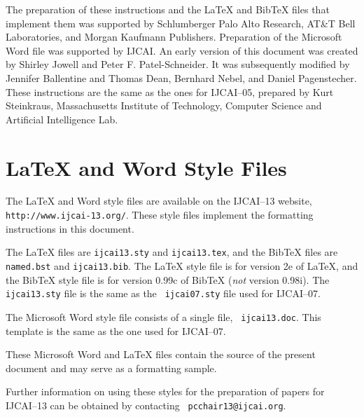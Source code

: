 \documentclass{article}
\begin{document}
The preparation of these instructions and the \LaTeX{} and Bib\TeX{}
files that implement them was supported by Schlumberger Palo Alto
Research, AT\&T Bell Laboratories, and Morgan Kaufmann Publishers.
Preparation of the Microsoft Word file was supported by IJCAI.  An
early version of this document was created by Shirley Jowell and Peter
F. Patel-Schneider.  It was subsequently modified by Jennifer
Ballentine and Thomas Dean, Bernhard Nebel, and Daniel Pagenstecher.
These instructions are the same as the ones for IJCAI--05, prepared by
Kurt Steinkraus, Massachusetts Institute of Technology, Computer
Science and Artificial Intelligence Lab.

\appendix

\section{\LaTeX{} and Word Style Files}\label{stylefiles}

The \LaTeX{} and Word style files are available on the IJCAI--13
website, {\tt http://www.ijcai-13.org/}.
These style files implement the formatting instructions in this
document.

The \LaTeX{} files are {\tt ijcai13.sty} and {\tt ijcai13.tex}, and
the Bib\TeX{} files are {\tt named.bst} and {\tt ijcai13.bib}. The
\LaTeX{} style file is for version 2e of \LaTeX{}, and the Bib\TeX{}
style file is for version 0.99c of Bib\TeX{} ({\em not} version
0.98i). The {\tt ijcai13.sty} file is the same as the {\tt
ijcai07.sty} file used for IJCAI--07.

The Microsoft Word style file consists of a single file, {\tt
ijcai13.doc}. This template is the same as the one used for
IJCAI--07.

These Microsoft Word and \LaTeX{} files contain the source of the
present document and may serve as a formatting sample.  

Further information on using these styles for the preparation of
papers for IJCAI--13 can be obtained by contacting {\tt
pcchair13@ijcai.org}.



\end{document}
